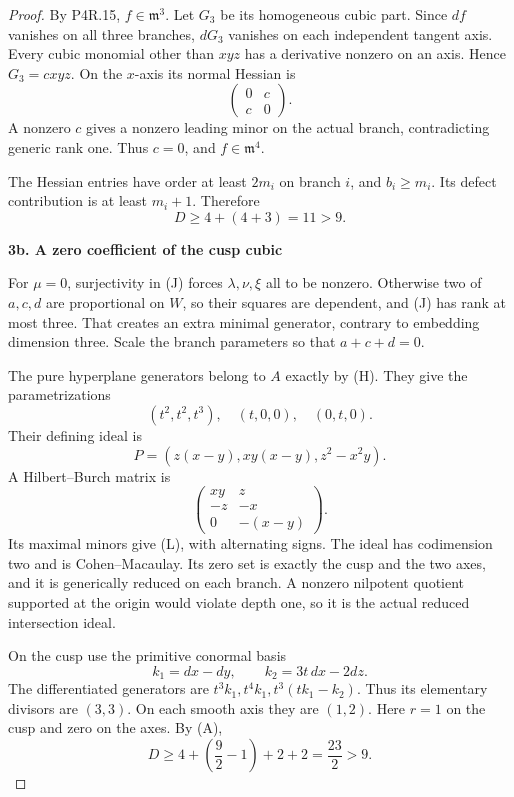 \begin{proof}
By P4R.15, \(f\in\mathfrak m^3\). Let \(G_3\) be its homogeneous cubic part. Since \(df\) vanishes on all three branches, \(dG_3\) vanishes on each independent tangent axis. Every cubic monomial other than \(xyz\) has a derivative nonzero on an axis. Hence \(G_3=cxyz\). On the \(x\)-axis its normal Hessian is \[
                         \begin{pmatrix}0&c\\c&0\end{pmatrix}.
\] A nonzero \(c\) gives a nonzero leading minor on the actual branch, contradicting generic rank one. Thus \(c=0\), and \(f\in\mathfrak m^4\).

The Hessian entries have order at least \(2m_i\) on branch \(i\), and \(b_i\ge m_i\). Its defect contribution is at least \(m_i+1\). Therefore \[
                            D\ge4+(4+3)=11>9.         \tag{K}
\]

\par\medskip\noindent\textbf{3b. A zero coefficient of the cusp cubic}\par\label{b.-a-zero-coefficient-of-the-cusp-cubic}

For \(\mu=0\), surjectivity in (J) forces \(\lambda,\nu,\xi\) all to be nonzero. Otherwise two of \(a,c,d\) are proportional on \(W\), so their squares are dependent, and (J) has rank at most three. That creates an extra minimal generator, contrary to embedding dimension three. Scale the branch parameters so that \(a+c+d=0\).

The pure hyperplane generators belong to \(A\) exactly by (H). They give the parametrizations \[
                       (t^2,t^2,t^3),\quad(t,0,0),\quad(0,t,0).
\] Their defining ideal is \[
                 P=(z(x-y),xy(x-y),z^2-x^2y).        \tag{L}
\] A Hilbert--Burch matrix is \[
 \begin{pmatrix}
 xy&z\\
 -z&-x\\
 0&-(x-y)
 \end{pmatrix}.
\] Its maximal minors give (L), with alternating signs. The ideal has codimension two and is Cohen--Macaulay. Its zero set is exactly the cusp and the two axes, and it is generically reduced on each branch. A nonzero nilpotent quotient supported at the origin would violate depth one, so it is the actual reduced intersection ideal.

On the cusp use the primitive conormal basis \[
                     k_1=dx-dy,\qquad k_2=3t\,dx-2dz.
\] The differentiated generators are \(t^3k_1,t^4k_1,t^3(tk_1-k_2)\). Thus its elementary divisors are \((3,3)\). On each smooth axis they are \((1,2)\). Here \(r=1\) on the cusp and zero on the axes. By (A), \[
                  D\ge4+\left(\frac92-1\right)+2+2
                       =\frac{23}{2}>9.               \tag{M}
\]


\end{proof}
